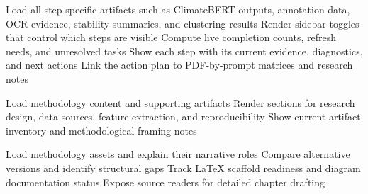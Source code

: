 \begin{algorithm}[H]
Load all step-specific artifacts such as ClimateBERT outputs, annotation data, OCR evidence, stability summaries, and clustering results\;
Render sidebar toggles that control which steps are visible\;
Compute live completion counts, refresh needs, and unresolved tasks\;
Show each step with its current evidence, diagnostics, and next actions\;
Link the action plan to PDF-by-prompt matrices and research notes\;
\caption{Thesis Action Plan Dashboard}
\label{alg:thesis-action-plan}
\end{algorithm}

\begin{algorithm}[H]
\caption{Appendix A.4 Model Utilities}
\label{alg:a4-model-suite}
\end{algorithm}

\begin{algorithm}[H]
Load methodology content and supporting artifacts\;
Render sections for research design, data sources, feature extraction, and reproducibility\;
Show current artifact inventory and methodological framing notes\;
\caption{Chapter 3 Methodology Narrative}
\label{alg:chapter3-methodology}
\end{algorithm}

\begin{algorithm}[H]
Load methodology assets and explain their narrative roles\;
Compare alternative versions and identify structural gaps\;
Track LaTeX scaffold readiness and diagram documentation status\;
Expose source readers for detailed chapter drafting\;
\caption{Methodology Documentation and Comparison}
\label{alg:methodology-doc-comparison}
\end{algorithm}

